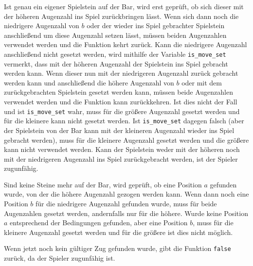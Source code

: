 Ist genau ein eigener Spielstein auf der Bar, wird erst geprüft, ob sich dieser mit der höheren Augenzahl ins Spiel zurückbringen lässt. Wenn sich dann noch die niedrigere Augenzahl von $b$ oder der wieder ins Spiel gebrachter Spielstein anschließend um diese Augenzahl setzen lässt, müssen beiden Augenzahlen verwendet werden und die Funktion kehrt zurück. Kann die niedrigere Augenzahl anschließend nicht gesetzt werden, wird mithilfe der Variable \lstinline$is_move_set$ vermerkt, dass mit der höheren Augenzahl der Spielstein ins Spiel gebracht werden kann. Wenn dieser nun mit der niedrigeren Augenzahl zurück gebracht werden kann und anschließend die höhere Augenzahl von $b$ oder mit dem zurückgebrachten Spielstein gesetzt werden kann, müssen beide Augenzahlen verwendet werden und die Funktion kann zurückkehren. Ist dies nicht der Fall und ist \lstinline$is_move_set$ wahr, muss für die größere Augenzahl gesetzt werden und für die kleinere kann nicht gesetzt werden. Ist \lstinline$is_move_set$ dagegen falsch (aber der Spielstein von der Bar kann mit der kleineren Augenzahl wieder ins Spiel gebracht werden), muss für die kleinere Augenzahl gesetzt werden und die größere kann nicht verwendet werden. Kann der Spielstein weder mit der höheren noch mit der niedrigeren Augenzahl ins Spiel zurückgebracht werden, ist der Spieler zugunfähig.

Sind keine Steine mehr auf der Bar, wird geprüft, ob eine Position $a$ gefunden wurde, von der die höhere Augenzahl gezogen werden kann. Wenn dann noch eine Position $b$ für die niedrigere Augenzahl gefunden wurde, muss für beide Augenzahlen gesetzt werden, andernfalls nur für die höhere. Wurde keine Position $a$ entsprechend der Bedingungen gefunden, aber eine Position $b$, muss für die kleinere Augenzahl gesetzt werden und für die größere ist dies nicht möglich.

Wenn jetzt noch kein gültiger Zug gefunden wurde, gibt die Funktion \lstinline$false$ zurück, da der Spieler zugunfähig ist.

